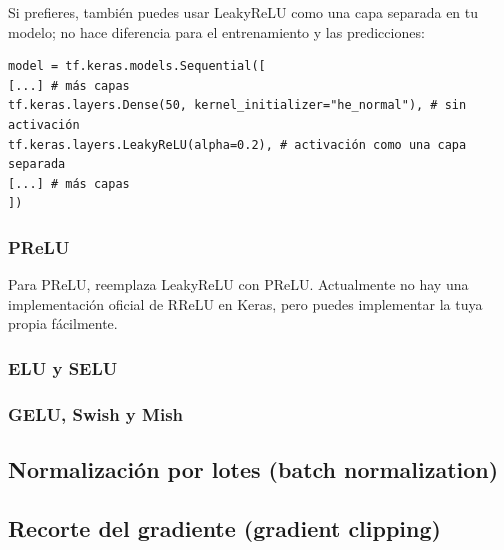 \documentclass[11pt]{article}
\begin{document}
Si prefieres, también puedes usar LeakyReLU como una capa separada en
tu modelo; no hace diferencia para el entrenamiento y las
predicciones:
\begin{verbatim}
model = tf.keras.models.Sequential([
[...] # más capas
tf.keras.layers.Dense(50, kernel_initializer="he_normal"), # sin activación
tf.keras.layers.LeakyReLU(alpha=0.2), # activación como una capa separada
[...] # más capas
])
\end{verbatim}
\subsubsection{PReLU}
\label{sec:org573eceb}
Para PReLU, reemplaza LeakyReLU con PReLU. Actualmente no hay una
implementación oficial de RReLU en Keras, pero puedes implementar la
tuya propia fácilmente.

\subsubsection{ELU y SELU}
\label{sec:org0038b2e}
\subsubsection{GELU, Swish y Mish}
\label{sec:org5e66577}
\subsection{Normalización por lotes (batch normalization)}
\label{sec:org296264a}
\subsection{Recorte del gradiente (gradient clipping)}
\label{sec:org554d6d2}
\end{document}
